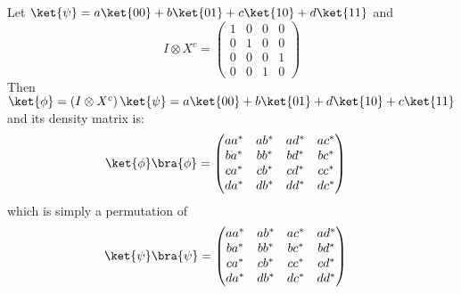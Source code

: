\begingroup
%
\par Let $\ket{\psi} = a \ket{00} + b \ket{01} + c \ket{10} + d \ket{11}$ and
$$
I \otimes X^c = \begin{pmatrix} 1 & 0 & 0 & 0 \\ 0 & 1 & 0 & 0 \\ 0 & 0 & 0 & 1 \\ 0 & 0 & 1 & 0 \end{pmatrix}
$$
%
Then $\ket{\phi} = \left( I \otimes X^c \right) \ket{\psi} = a \ket{00} + b \ket{01} + d \ket{10} + c \ket{11}$ and its density matrix is:
%
\begin{align*}
\ket{\phi} \bra{\phi} &= \begin{pmatrix} aa^* & ab^* & ad^* & ac^* \\ ba^* & bb^* & bd^* & bc^* \\ ca^* & cb^* & cd^* & cc^* \\ da^* & db^* & dd^* & dc^* \end{pmatrix}
\end{align*}
%
which is simply a permutation of
\begin{align*}
\ket{\psi} \bra{\psi} &= \begin{pmatrix} aa^* & ab^* & ac^* & ad^* \\ ba^* & bb^* & bc^* & bd^* \\ ca^* & cb^* & cc^* & cd^* \\ da^* & db^* & dc^* & dd^* \end{pmatrix}
\end{align*}
%
\endgroup

